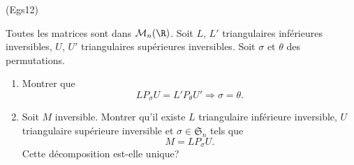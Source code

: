 \begin{tiny}(Egs12)\end{tiny} Toutes les matrices sont dans $\mathcal{M}_n(\R)$. Soit $L$, $L'$ triangulaires inférieures inversibles, $U$, $U'$ triangulaires supérieures inversibles. Soit $\sigma$ et $\theta$ des permutations.
\begin{enumerate}
 \item Montrer que
 \[
  L P_{\sigma} U = L' P_{\theta} U' \Rightarrow \sigma = \theta.
 \]
 \item Soit $M$ inversible. Montrer qu'il existe $L$ triangulaire inférieure inversible, $U$ triangulaire supérieure inversible et $\sigma \in \mathfrak{S}_n$ tels que
\[
 M = L P_{\sigma} U.
\]
Cette décomposition est-elle unique?
\end{enumerate}
